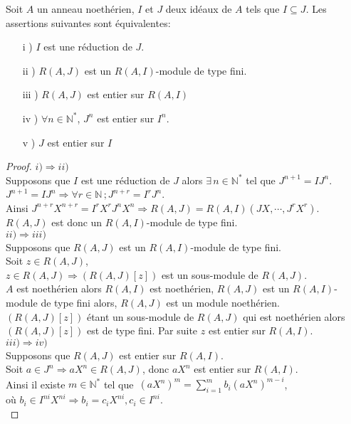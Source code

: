 \begin{maproposition}
	Soit $A$ un anneau noethérien, $I$ et $J$ deux idéaux de $A$ tels que $I \subseteq J$. Les assertions suivantes sont équivalentes: 
	\begin{enumerate}
		\item[i] ) $I$ est une réduction de $J$.
		\item[ii] ) $R(A,J)$ est un $R(A,I)$-module de type fini.
		\item[iii] ) $R(A,J)$ est entier sur $R(A,I)$
		\item[iv] ) $\forall n \in \mathbb{N^*}$, $J^n$ est entier sur $I^n$.
		\item[v] ) $J$ est entier sur $I$
	\end{enumerate}
\end{maproposition}
\begin{proof}
	$i) \Rightarrow ii)$ \\
	Supposons que $I$ est une réduction de $J$ alors $\exists \, n \in \mathbb{N}^{*}$ tel que $J^{n+1} = IJ^{n}$.\\
	$J^{n+1} = IJ^{n} \Rightarrow \forall r \in \mathbb{N} \, ; J^{n+r} = I^rJ^{n}$.\\
	Ainsi $J^{n+r} X^{n+r} = I^r X^rJ^{n} X^n \Rightarrow R(A,J) = R(A,I)(JX, \cdots ,J^rX^r)$.\\
	$R(A,J)$ est donc un $R(A,I)$-module de type fini.\\
	$ii) \Rightarrow iii)$ \\
	Supposons que $R(A,J)$ est un $R(A,I)$-module de type fini.\\
	Soit $z \in R(A,J)$,\\
	$z \in R(A,J) \Rightarrow (R(A,J)[z])$ est un sous-module de $R(A,J)$.\\
	$A$ est noethérien alors $R(A,I)$ est noethérien, $R(A,J)$ est un $R(A,I)$-module de type fini alors, $R(A,J)$ est un module noethérien.\\
	$(R(A,J)[z])$ étant un sous-module de $R(A,J)$ qui est noethérien alors $(R(A,J)[z])$ est de type fini. Par suite $z$ est entier sur $R(A,I)$.\\
	$iii) \Rightarrow iv)$ \\
	Supposons que $R(A,J)$ est entier sur $R(A,I)$.\\
	Soit $a \in J^n \Rightarrow aX^n \in R(A,J)$, donc $aX^n$ est entier sur $R(A,I)$.\\
	Ainsi il existe $m \in \mathbb{N^*}$  tel que  $\, (aX^n)^m = \displaystyle \sum_{i=1}^{m}{b_i (aX^n)^{m-i}}$,\\ où $b_i \in I^{ni} X^{ni} \Rightarrow b_i = c_i X^{ni} , c_i \in I^{ni}$.\\

\end{proof}
